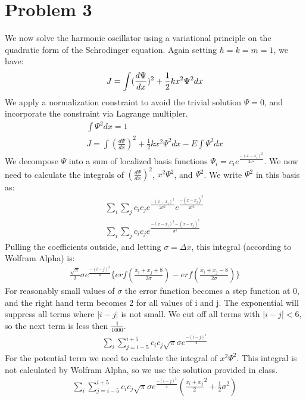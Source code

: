 \documentclass[a4paper,10pt]{article}
\numberwithin{equation}{section}
\begin{document}
\section{Problem 3}
We now solve the harmonic oscillator using a variational principle on the quadratic form of the Schrodinger equation.
Again setting $\hbar =k=m=1$, we have:
\begin{equation}
J=\int (\frac{d\Psi }{dx})^{2}+\frac{1}{2}kx^2\Psi ^2 dx\\
\end{equation}
We apply a normalization constraint to avoid the trivial solution $\Psi=0$, and incorporate the constraint via Lagrange multipler.
\begin{gather}
\int \Psi^2 dx = 1\\
J=\int (\frac{d\Psi }{dx})^{2}+\frac{1}{2}kx^2\Psi ^2 dx - E\int \Psi^2 dx
\end{gather}
We decompose $\Psi$ into a sum of localized basis functions $\Psi_i=c_ie^{\frac{-(x-x_i)^2}{2\sigma ^2}}$.
We now need to calculate the integrals of $(\frac{d\Psi }{dx})^{2}$, $x^2\Psi ^2$, and $\Psi^2$.
We write $\Psi^2$ in this basis as:
\begin{gather}
 \sum_{i}\sum_{j}c_ic_je^{\frac{-(x-x_i)^2}{2\sigma ^2}}e^{\frac{-(x-x_j)^2}{2\sigma ^2}}\\
 \sum_{i}\sum_{j}c_ic_je^{\frac{-(x-x_i)^2-(x-x_j)^2}{\sigma ^2}}
\end{gather}
Pulling the coefficients outside, and letting $\sigma=\Delta x$, this integral (according to Wolfram Alpha) is:
\begin{gather}
\frac{\sqrt{\pi}}{2}\sigma e^{\frac{-(i-j)^2}{4}}\{erf(\frac{x_i+x_j+8}{2\sigma})-erf(\frac{x_i+x_j-8}{2\sigma})\}
\end{gather}
For reasonably small values of $\sigma$ the error function becomes a step function at 0, and the right hand term becomes 2 for all values of i and j.
The  exponential will suppress all terms where $|i-j|$ is not small. We cut off all terms with  $|i-j|<6$, so the next term is less then $\frac{1}{1000}$.
\begin{gather}
 \sum_{i}\sum_{j=i-5}^{i+5}c_ic_j\sqrt{\pi}\sigma e^{\frac{-(i-j)^2}{4}}
\end{gather}
For the potential term we need to caclulate the integral of $x^2\Psi ^2$. 
This integral is not calculated by Wolfram Alpha, so we use the solution provided in class.
\begin{gather}
 \sum_{i}\sum_{j=i-5}^{i+5}c_ic_j\sqrt{\pi}\sigma e^{\frac{-(i-j)^2}{4}}(\frac{x_i+x_j}{2}^2+\frac{1}{2}\sigma ^2)
\end{gather}
\end{document}
